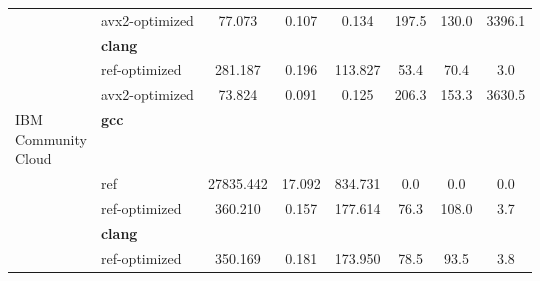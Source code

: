 \begin{table}
\begin{tabularx}{\linewidth}{l l c c c c c c}
          & avx2-optimized & 77.073 & 0.107 & 0.134 & 197.5 & 130.0 & 3396.1\\
          & \textbf{clang} & & & & & \\
          & ref-optimized & 281.187 & 0.196 & 113.827 & 53.4 & 70.4 & 3.0\\
          & avx2-optimized & 73.824 & 0.091 & 0.125 & 206.3 & 153.3 & 3630.5\\
          \midrule
          \multirowcell{5}{IBM\\ Community\\ Cloud}
          & \textbf{gcc} & & & & & \\
          & ref & 27835.442 & 17.092 & 834.731 & 0.0 & 0.0 & 0.0\\
          & ref-optimized & 360.210 & 0.157 & 177.614 & 76.3 & 108.0 & 3.7\\
          & \textbf{clang} & & & & & \\
          & ref-optimized & 350.169 & 0.181 & 173.950 & 78.5 & 93.5 & 3.8\\
        \bottomrule
    \end{tabularx}
\end{table}